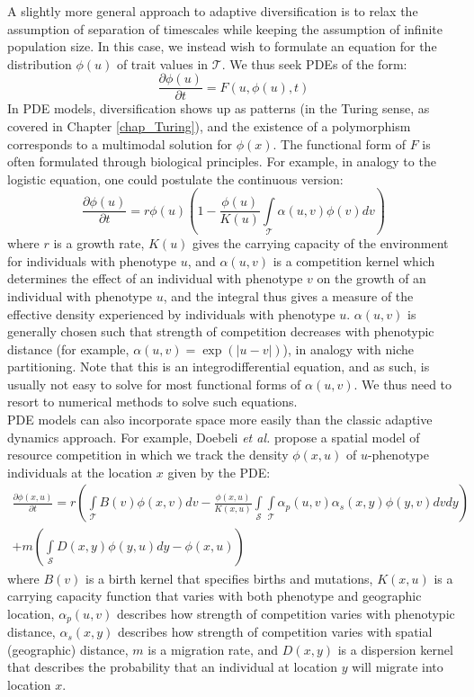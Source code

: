 A slightly more general approach to adaptive diversification is to relax the assumption of separation of timescales while keeping the assumption of infinite population size. In this case, we instead wish to formulate an equation for the distribution $\phi(u)$ of trait values in $\mathcal{T}$. We thus seek PDEs of the form:
\begin{equation*}
	\frac{\partial \phi(u)}{\partial t} = F(u,\phi(u),t)
\end{equation*}
In PDE models, diversification shows up as patterns (in the Turing sense, as covered in Chapter \ref{chap_Turing}), and the existence of a polymorphism corresponds to a multimodal solution for $\phi(x)$. The functional form of $F$ is often formulated through biological principles. For example, in analogy to the logistic equation, one could postulate the continuous version:
\begin{equation}
	\label{cts_logistic}
	\frac{\partial \phi(u)}{\partial t} = r\phi(u)\left(1 - \frac{\phi(u)}{K(u)}\int\limits_{\mathcal{T}}\alpha(u,v)\phi(v)dv\right)
\end{equation}
where $r$ is a growth rate, $K(u)$ gives the carrying capacity of the environment for individuals with phenotype $u$, and $\alpha(u,v)$ is a competition kernel which determines the effect of an individual with phenotype $v$ on the growth of an individual with phenotype $u$, and the integral thus gives a measure of the effective density experienced by individuals with phenotype $u$. $\alpha(u,v)$ is generally chosen such that strength of competition decreases with phenotypic distance (for example, $\alpha(u,v) = \exp(|u-v|)$), in analogy with niche partitioning. Note that this is an integrodifferential equation, and as such, is usually not easy to solve for most functional forms of $\alpha(u,v)$. We thus need to resort to numerical methods to solve such equations. \\
PDE models can also incorporate space more easily than the classic adaptive dynamics approach. For example, Doebeli \textit{et al.} propose a spatial model of resource competition in which we track the density $\phi(x,u)$ of $u$-phenotype individuals at the location $x$ given by the PDE:
\begin{equation}
	\begin{split}
		\label{spatial_PDE}
		\frac{\partial \phi(x,u)}{\partial t} = r\left(\int\limits_{\mathcal{T}}B(v)\phi(x,v)dv - \frac{\phi(x,u)}{K(x,u)}\int\limits_{\mathcal{S}}\int\limits_{\mathcal{T}}\alpha_p(u,v)\alpha_s(x,y)\phi(y,v)dvdy\right) \\ +m\left(\int\limits_{\mathcal{S}}D(x,y)\phi(y,u)dy - \phi(x,u)\right)
	\end{split}
\end{equation}
where $B(v)$ is a birth kernel that specifies births and mutations, $K(x,u)$ is a carrying capacity function that varies with both phenotype and geographic location, $\alpha_p(u,v)$ describes how strength of competition varies with phenotypic distance, $\alpha_s(x,y)$ describes how strength of competition varies with spatial (geographic) distance, $m$ is a migration rate, and $D(x,y)$ is a dispersion kernel that describes the probability that an individual at location $y$ will migrate into location $x$.

